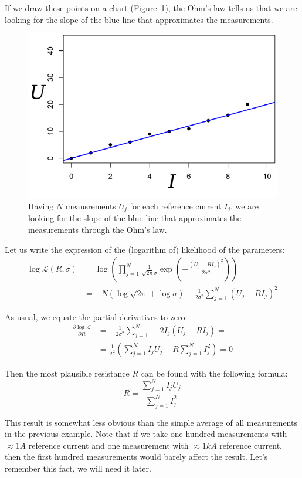 \documentclass{article}
\begin{document}
If we draw these points on a chart (Figure~\ref{fig:URI}), the Ohm's law tells us that we are looking for the slope of the blue line that approximates the measurements.
\begin{figure}[htb!]
\centering
\includegraphics[width=.5\columnwidth]{URI}
\caption{Having $N$ meausrements $U_j$ for each reference current $I_j$, we are looking for the slope of the blue line that approximates the measurements through the Ohm's law.}
\label{fig:URI}
\end{figure}


Let us write the expression of the (logarithm of) likelihood of the parameters:
\begin{align*}
\log \mathcal{L}(R,\sigma) & = \log \left(\prod\limits_{j=1}^N  \frac{1}{\sqrt{2\pi}\sigma} \exp\left(-\frac{(U_j-R I_j)^2}{2\sigma^2}\right)\right) =\\
& = -N \left(\log\sqrt{2\pi} + \log\sigma\right) - \frac{1}{2\sigma^2} \sum\limits_{j=1}^N (U_j- R I_j)^2
\end{align*}

As usual, we equate the partial derivatives to zero:
\begin{align*}
\frac{\partial\log\mathcal{L}}{\partial R} &=  -\frac{1}{2\sigma^2}\sum\limits_{j=1}^N -2I_j (U_j- R I_j) = \\
&= \frac{1}{\sigma^2}\left(\sum\limits_{j=1}^N I_jU_j - R\sum\limits_{j=1}^N I_j^2\right) = 0
\end{align*}

Then the most plausible resistance $R$ can be found with the following formula:
$$
R = \frac{\sum\limits_{j=1}^N I_jU_j}{\sum\limits_{j=1}^N I_j^2}
$$

This result is somewhat less obvious than the simple average of all measurements in the previous example.
Note that if we take one hundred measurements with $\approx 1A$ reference current and one measurement with $\approx 1kA$ reference current,
then the first hundred measurements would barely affect the result. Let's remember this fact, we will need it later.
\end{document}
